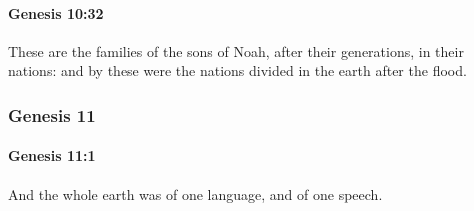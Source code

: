 		\paragraph{Genesis 10:32} %
			\label{GENESIS-10-32}

			These are the families of the sons of Noah, after their generations, in their nations: and by these were the nations divided in the earth after the flood.

	\subsubsection{Genesis 11} %
		\label{GENESIS-11}

		\paragraph{Genesis 11:1} %
			\label{GENESIS-11-1}

			And the whole earth was of one language, and of one speech.

